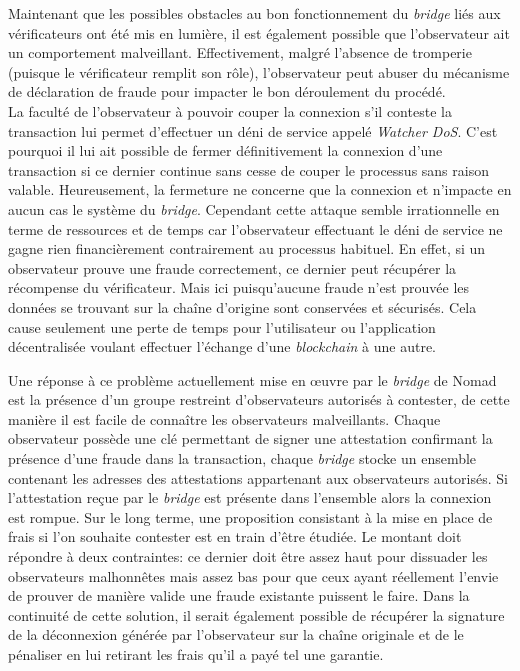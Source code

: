 Maintenant que les possibles obstacles au bon fonctionnement du \textit{bridge} liés aux \gls{vérificateur}s ont été mis en lumière, il est également possible que l’observateur ait un comportement malveillant.  Effectivement, malgré l’absence de tromperie (puisque le \gls{vérificateur} remplit son rôle), l’observateur peut abuser du mécanisme de déclaration de fraude pour impacter le bon déroulement du procédé. \\

La faculté de l’observateur à pouvoir couper la connexion s’il conteste la transaction lui permet d’effectuer un déni de service appelé \textit{Watcher DoS}. C’est pourquoi il lui ait possible de fermer définitivement la connexion d’une transaction si ce dernier continue sans cesse de couper le processus sans raison valable. Heureusement, la fermeture ne concerne que la connexion et n’impacte en aucun cas le système du \textit{bridge}. Cependant cette attaque semble irrationnelle en terme de ressources et de temps car l’observateur effectuant le déni de service ne gagne rien financièrement contrairement au processus habituel. En effet, si un observateur prouve une fraude correctement, ce dernier peut récupérer la récompense du \gls{vérificateur}. Mais ici puisqu’aucune fraude n’est prouvée les données se trouvant sur la chaîne d’origine sont conservées et sécurisés. Cela cause seulement une perte de temps pour l’utilisateur ou l’application décentralisée voulant effectuer l'échange d’une \textit{\gls{blockchain}} à une autre.

Une réponse à ce problème actuellement mise en œuvre par le \textit{bridge} de \gls{Nomad} est la présence d’un groupe restreint d’observateurs autorisés à contester, de cette manière il est facile de connaître les observateurs malveillants. Chaque observateur possède une clé permettant de signer une attestation confirmant la présence d’une fraude dans la transaction, chaque \textit{bridge} stocke un ensemble contenant les adresses des attestations appartenant aux observateurs autorisés. Si l’attestation reçue par le \textit{bridge} est présente dans l’ensemble alors la connexion est rompue\cite{NomadDocsWatcher}.
Sur le long terme, une proposition consistant à la mise en place de frais si l’on souhaite contester est en train d’être étudiée. Le montant doit répondre à deux contraintes: ce dernier doit être assez haut pour dissuader les observateurs malhonnêtes mais assez bas pour que ceux ayant réellement l’envie de prouver de manière valide une fraude existante puissent le faire. Dans la continuité de cette solution, il serait également possible de récupérer la signature de la déconnexion générée par l’observateur sur la chaîne originale et de le pénaliser en lui retirant les frais qu’il a payé tel une garantie\cite{OptimisticBhuptani}.

